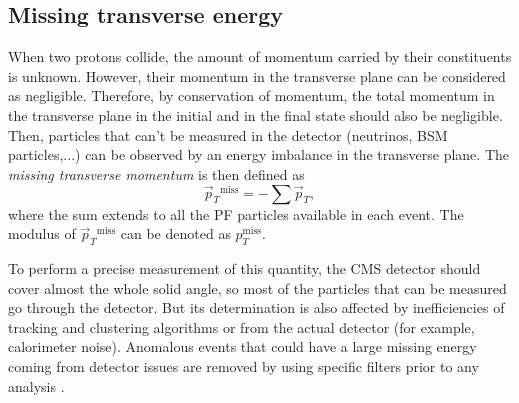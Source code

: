\documentclass[../main.tex]{subfiles}
\begin{document}
\subsection{Missing transverse energy}

When two protons collide, the amount of momentum carried by their constituents is unknown. However, their momentum in the transverse plane can be considered as negligible. Therefore, by conservation of momentum, the total momentum in the transverse plane in the initial and in the final state should also be negligible. Then, particles that can't be measured in the detector (neutrinos, BSM particles,...) can be observed by an energy imbalance in the transverse plane. The \textit{missing transverse momentum} is then defined as
\begin{equation}
	\vec{p}_T{}^{\text{miss}} = - \sum \vec{p}_T,
\end{equation}
where the sum extends to all the PF particles available in each event. The modulus of $\vec{p}_T{}^{\text{miss}}$ can be denoted as $p_T^{\text{miss}}$.

To perform a precise measurement of this quantity, the CMS detector should cover almost the whole solid angle, so most of the particles that can be measured go through the detector. But its determination is also affected by inefficiencies of tracking and clustering algorithms or from the actual detector (for example, calorimeter noise). Anomalous events that could have a large missing energy coming from detector issues are removed by using specific filters prior to any analysis \cite{intro:id:met}.
\end{document}
